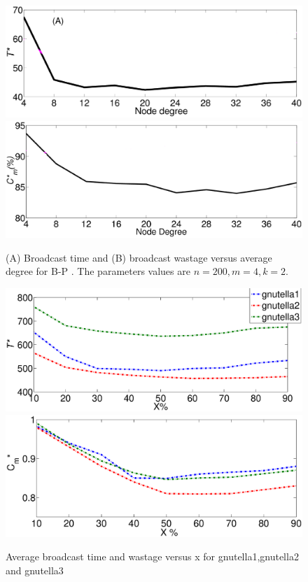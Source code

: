 \begin{figure}
\centering
\includegraphics[scale=0.19]{./texfiles/Chapter_3/netsci/figs1/random_graphs_delay1.eps}
\includegraphics[scale=0.18]{./texfiles/Chapter_3/netsci/figs1/random_graphs_wastage1.eps}
\caption{(A) Broadcast time and (B) broadcast wastage versus average degree for B-P . The parameters values are $n=200, m=4, k=2$.}
\label{DiffTopologyGnp_N200_varyD_push_pull}
\end{figure}
\begin{figure}
\centering
\includegraphics[scale=0.19]{./texfiles/Chapter_3/netsci/figs1/xperbt.eps}
\includegraphics[scale=0.19]{./texfiles/Chapter_3/netsci/figs1/xperwa.eps}
\caption{Average broadcast time and wastage versus x for gnutella1,gnutella2 and gnutella3}
\label{ps_bt}
\end{figure}


